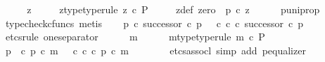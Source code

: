 \begin{isabellebody}
\ \ \isamarkupfalse%
\ \isamarkupfalse%
\ z{\isacharprime}{\kern0pt}\ \isanewline
\ \ \ \ z{\isacharprime}{\kern0pt}{\isacharunderscore}{\kern0pt}type{\isacharbrackleft}{\kern0pt}type{\isacharunderscore}{\kern0pt}rule{\isacharbrackright}{\kern0pt}{\isacharcolon}{\kern0pt}\ {\isachardoublequoteopen}z{\isacharprime}{\kern0pt}\ {\isasymin}\isactrlsub c\ P{\isachardoublequoteclose}\ \isanewline
\ \ \ \ z{\isacharprime}{\kern0pt}{\isacharunderscore}{\kern0pt}def{\isacharcolon}{\kern0pt}\ {\isachardoublequoteopen}zero\ {\isacharequal}{\kern0pt}\ p{\isacharprime}{\kern0pt}\ {\isasymcirc}\isactrlsub c\ z{\isacharprime}{\kern0pt}{\isachardoublequoteclose}\isanewline
\ \ \ \ \isamarkupfalse%
\ p{\isacharprime}{\kern0pt}{\isacharunderscore}{\kern0pt}uni{\isacharunderscore}{\kern0pt}prop\ \isamarkupfalse%
\ {\isacharparenleft}{\kern0pt}typecheck{\isacharunderscore}{\kern0pt}cfuncs{\isacharcomma}{\kern0pt}\ metis{\isacharparenright}{\kern0pt}\isanewline
\isanewline
\ \ \isamarkupfalse%
\ {\isachardoublequoteopen}p\ {\isasymcirc}\isactrlsub c\ successor\ {\isasymcirc}\isactrlsub c\ p{\isacharprime}{\kern0pt}\ {\isacharequal}{\kern0pt}\ {\isacharparenleft}{\kern0pt}{\isasymt}\ {\isasymcirc}\isactrlsub c\ {\isasymbeta}\isactrlbsub {\isasymnat}\isactrlsub c\isactrlesub {\isacharparenright}{\kern0pt}\ {\isasymcirc}\isactrlsub c\ successor\ {\isasymcirc}\isactrlsub c\ p{\isacharprime}{\kern0pt}{\isachardoublequoteclose}\isanewline
\ \ \isamarkupfalse%
\ {\isacharparenleft}{\kern0pt}etcs{\isacharunderscore}{\kern0pt}rule\ one{\isacharunderscore}{\kern0pt}separator{\isacharparenright}{\kern0pt}\isanewline
\ \ \ \ \isamarkupfalse%
\ m\isanewline
\ \ \ \ \isamarkupfalse%
\ m{\isacharunderscore}{\kern0pt}type{\isacharbrackleft}{\kern0pt}type{\isacharunderscore}{\kern0pt}rule{\isacharbrackright}{\kern0pt}{\isacharcolon}{\kern0pt}\ {\isachardoublequoteopen}m\ {\isasymin}\isactrlsub c\ P{\isachardoublequoteclose}\isanewline
\isanewline
\ \ \ \ \isamarkupfalse%
\ {\isachardoublequoteopen}p\ \ {\isasymcirc}\isactrlsub c\ p{\isacharprime}{\kern0pt}\ {\isasymcirc}\isactrlsub c\ m\ {\isacharequal}{\kern0pt}\ {\isasymt}\ {\isasymcirc}\isactrlsub c\ {\isasymbeta}\isactrlbsub {\isasymnat}\isactrlsub c\isactrlesub \ {\isasymcirc}\isactrlsub c\ p{\isacharprime}{\kern0pt}\ {\isasymcirc}\isactrlsub c\ m{\isachardoublequoteclose}\isanewline
\ \ \ \ \ \ \isamarkupfalse%
\ {\isacharparenleft}{\kern0pt}etcs{\isacharunderscore}{\kern0pt}assocl{\isacharcomma}{\kern0pt}\ simp\ add{\isacharcolon}{\kern0pt}\ p{\isacharprime}{\kern0pt}{\isacharunderscore}{\kern0pt}equalizer{\isacharparenright}{\kern0pt}\isanewline

\end{isabellebody}
